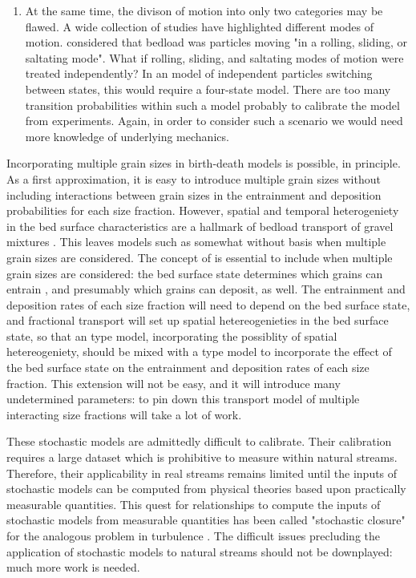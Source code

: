 \begin{enumerate}
	\item At the same time, the divison of motion into only two categories may be flawed. A wide collection of studies have highlighted different modes of motion. \citet{Einstein1950} considered that bedload was particles moving "in a rolling, sliding, or saltating mode". What if rolling, sliding, and saltating modes of motion were treated independently? In an \citet{Ancey2006} model of independent particles switching between states, this would require a four-state model. There are too many transition probabilities within such a model probably to calibrate the model from experiments. Again, in order to consider such a scenario we would need more knowledge of underlying mechanics. 
	
\end{enumerate}

Incorporating multiple grain sizes in birth-death models is possible, in principle. 
As a first approximation, it is easy to introduce multiple grain sizes without including interactions between grain sizes in the entrainment and deposition probabilities for each size fraction. 
However, spatial and temporal heterogeniety in the bed surface characteristics are a hallmark of bedload transport of gravel mixtures \citep{Hassan2008}. 
This leaves models such as \citet{Ancey2008} somewhat without basis when multiple grain sizes are considered. 
The concept of \citet{Turowski} is essential to include when multiple grain sizes are considered: the bed surface state determines which grains can entrain \citep[e.g.][]{Wilcock2003, Parker1982}, and presumably which grains can deposit, as well. 
The entrainment and deposition rates of each size fraction will need to depend on the bed surface state, and fractional transport will set up spatial hetereogenieties in the bed surface state, so that an \citet{Ancey2014} type model, incorporating the possiblity of spatial hetereogeniety, should be mixed with a \citet{Turowski2009} type model to incorporate the effect of the bed surface state on the entrainment and deposition rates of each size fraction. 
This extension will not be easy, and it will introduce many undetermined parameters: to pin down this transport model of multiple interacting size fractions will take a lot of work. 


These stochastic models are admittedly difficult to calibrate. 
Their calibration requires a large dataset which is prohibitive to measure within natural streams. 
Therefore, their applicability in real streams remains limited until the inputs of stochastic models can be computed from physical theories based upon practically measurable quantities. 
This quest for relationships to compute the inputs of stochastic models from measurable quantities has been called "stochastic closure" for the analogous problem in turbulence \citep{Heyman2016}. 
The difficult issues precluding the application of stochastic models to natural streams should not be downplayed: much more work is needed. 


\endinput

Any text after an \endinput is ignored.
You could put scraps here or things in progress.
